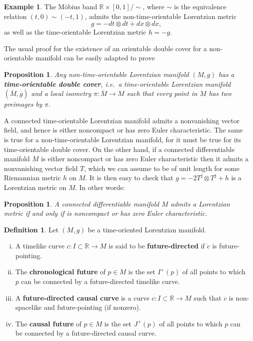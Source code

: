 \documentclass[12pt]{amsart}
\newcommand{\bbR}{\mathbb{R}}      %
\newtheorem{Prop}[Thm]{Proposition}
\theoremstyle{definition}
\newtheorem{Def}[Thm]{Definition}
\newtheorem{Example}[Thm]{Example}
\theoremstyle{remark}
\begin{document}
\begin{Example}
The M\"obius band $\bbR \times [0,1] / \sim$, where $\sim$ is the equivalence relation $(t,0) \sim (-t, 1)$, admits the non-time-orientable Lorentzian metric
\[
g = - dt \otimes dt + dx \otimes dx,
\]
as well as the time-orientable Lorentzian metric $h=-g$.
\end{Example}

The usual proof for the existence of an orientable double cover for a non-orientable manifold can be easily adapted to prove

\begin{Prop}
Any non-time-orientable Lorentzian manifold $(M,g)$ has a {\bf time-orientable double cover}, i.e.~a time-orientable Lorentzian manifold $(\overline{M},\overline{g})$ and a local isometry $\pi:\overline{M}\to M$ such that every point in $M$ has two preimages by $\pi$.
\end{Prop}

A connected time-orientable Lorentzian manifold admits a nonvanishing vector field, and hence is either noncompact or has zero Euler characteristic. The same is true for a non-time-orientable Lorentzian manifold, for it must be true for its time-orientable double cover. On the other hand, if a connected differentiable manifold $M$ is either noncompact or has zero Euler characteristic then it admits a nonvanishing vector field $T$, which we can assume to be of unit length for some Riemannian metric $h$ on $M$. It is then easy to check that  $g = -2 T^\sharp \otimes T^\sharp + h$ is a Lorentzian metric on $M$. In other words:

\begin{Prop}
A connected differentiable manifold $M$ admits a Lorentzian metric if and only if is noncompact or has zero Euler characteristic.
\end{Prop}

\begin{Def}
Let $(M,g)$ be a time-oriented Lorentzian manifold.
\begin{enumerate}[(i)]
\item
A timelike curve $c:I \subset \bbR \to M$ is said to be {\bf future-directed} if $\dot{c}$ is future-pointing.
\item
The {\bf chronological future} of $p\in M$ is the set $I^+(p)$ of all points to which $p$ can be connected by a future-directed timelike curve.
\item
A {\bf future-directed causal curve} is a curve $c:I \subset \bbR \to M$ such that $\dot{c}$ is non-spacelike and future-pointing (if nonzero).
\item
The {\bf causal future} of $p\in M$ is the set $J^+(p)$ of all points to which $p$ can be connected by a future-directed causal curve.
\end{enumerate}
\end{Def}
\end{document}
